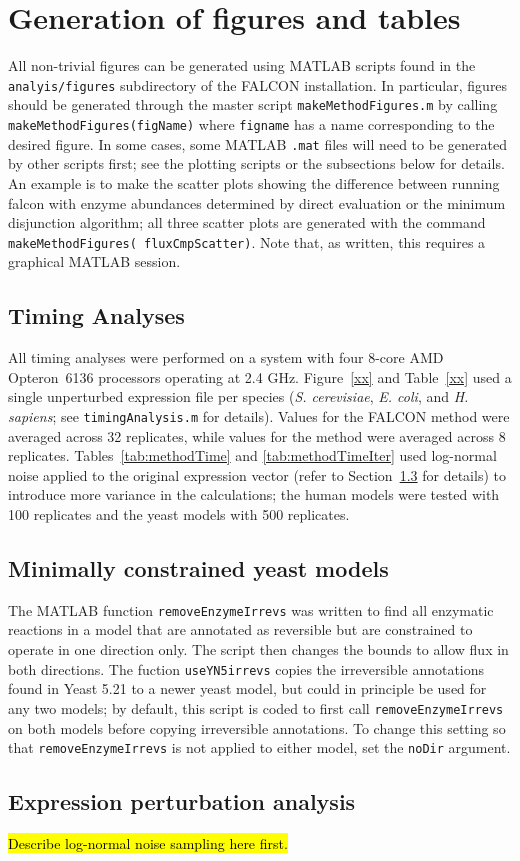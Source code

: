 \section{Generation of figures and tables}

All non-trivial figures can be generated using MATLAB scripts found in
the \texttt{analyis/figures} subdirectory of the FALCON installation.
In particular, figures should be generated through the master script
\texttt{makeMethodFigures.m} by calling
\texttt{makeMethodFigures(figName)} where \texttt{figname} has a name
corresponding to the desired figure.  In some cases, some MATLAB
\texttt{.mat} files will need to be generated by other scripts first;
see the plotting scripts or the subsections below for details. An
example is to make the scatter plots showing the difference between
running falcon with enzyme abundances determined by direct evaluation
or the minimum disjunction algorithm; all three scatter plots are
generated with the command \texttt{makeMethodFigures(\textquotesingle
fluxCmpScatter\textquotesingle)}. Note that, as written, this requires
a graphical MATLAB session.

\subsection{Timing Analyses}
All timing analyses were performed on a system with four 8-core AMD
Opteron\texttrademark\ 6136 processors operating at 2.4
GHz. Figure~\ref{xx} and \suppOrApp Table~\ref{xx} used a single
unperturbed expression file per species (\textit{S. cerevisiae},
\textit{E. coli}, and \textit{H. sapiens}; see
\texttt{timingAnalysis.m} for details). Values for the FALCON method
were averaged across 32 replicates, while values for the
\citealt{Lee2012} method were averaged across 8 replicates. \suppOrApp
Tables~\ref{tab:methodTime} and \ref{tab:methodTimeIter} used
log-normal noise applied to the original expression vector (refer to
Section~\ref{sec:noise} for details) to introduce more variance in the
calculations; the human models were tested with 100 replicates and the
yeast models with 500 replicates.

\subsection{Minimally constrained yeast models}
The MATLAB function \texttt{removeEnzymeIrrevs} was written to find
all enzymatic reactions in a model that are annotated as reversible
but are constrained to operate in one direction only. The script then
changes the bounds to allow flux in both directions. The fuction
\texttt{useYN5irrevs} copies the irreversible annotations found in
Yeast 5.21 \citep{Lee2012} to a newer yeast model, but could in
principle be used for any two models; by default, this script is coded
to first call \texttt{removeEnzymeIrrevs} on both models before
copying irreversible annotations. To change this setting so that
\texttt{removeEnzymeIrrevs} is not applied to either model, set the
\texttt{noDir} argument.

\subsection{Expression perturbation analysis}
\label{sec:noise}
\hl{Describe log-normal noise sampling here first.}
